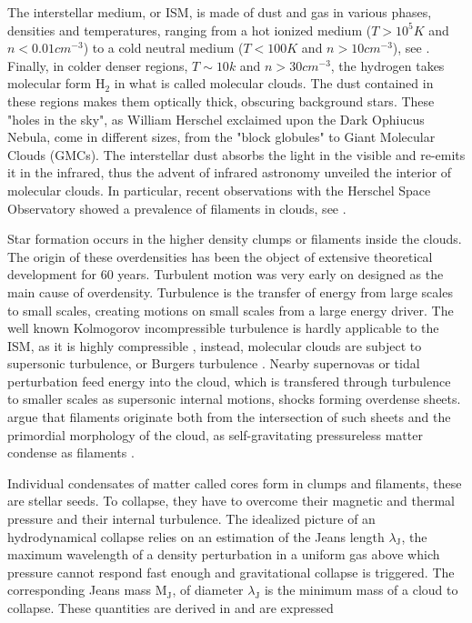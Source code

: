 The interstellar medium, or ISM, is made of dust and gas in various phases, densities and temperatures, ranging from a hot ionized medium ($T>10^5 K$ and $n < 0.01 cm^{-3}$) to a cold neutral medium ($T<100 K$ and $n > 10 cm^{-3}$),  see \cite{Field1969}. Finally, in colder denser regions, $T\sim 10k$ and $n>30cm^{-3}$, the hydrogen takes molecular form H$_2$ in what is called molecular clouds. The dust contained in these regions makes them optically thick, obscuring background stars. These "holes in the sky", as William Herschel exclaimed upon the Dark Ophiucus Nebula\citep{Houghton1942}, come in different sizes, from the "block globules" to Giant Molecular Clouds (GMCs).
The interstellar dust absorbs the light in the visible and re-emits it in the infrared, thus the advent of infrared astronomy unveiled the interior of molecular clouds. In particular, recent observations with the Herschel Space Observatory showed a prevalence of filaments in clouds, see \cite{Andre2010}.

Star formation occurs in the higher density clumps or filaments inside the clouds. The origin of these overdensities has been the object of extensive theoretical development for 60 years. Turbulent motion was very early on designed as the main cause of overdensity. Turbulence is the transfer of energy from large scales to small scales, creating motions on small scales from a large energy driver. The well known Kolmogorov incompressible turbulence is hardly applicable to the ISM, as it is highly compressible \citep{Scalo1998}, instead, molecular clouds are subject to supersonic turbulence, or Burgers turbulence \citep{Frisch2001}. Nearby supernovas or tidal perturbation feed energy into the cloud, which is transfered through turbulence to smaller scales as supersonic internal motions, shocks forming overdense sheets. \cite{McKee2007} argue that filaments originate both from the intersection of such sheets and the primordial morphology of the cloud, as self-gravitating pressureless matter condense as filaments \citep{Springel2005}.


Individual condensates of matter called cores form in clumps and filaments, these are stellar seeds. To collapse, they have to overcome their magnetic and thermal pressure and their internal turbulence. The idealized picture of an hydrodynamical collapse relies on an estimation of the Jeans length $\lambda_\textrm{J}$, the maximum wavelength of a density perturbation in a uniform gas above which pressure cannot respond fast enough and gravitational collapse is triggered. The corresponding Jeans mass M$_\textrm{J}$, of diameter $\lambda_\textrm{J}$ is the minimum mass of a cloud to collapse. These quantities are derived in \cite{BT} and are expressed

